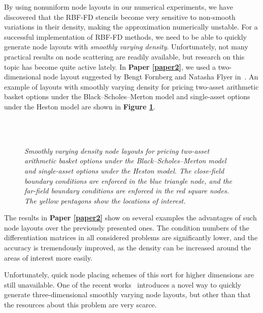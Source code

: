 \documentclass{UUThesisTemplate}
\begin{document}
\par
By using nonuniform node layouts in our numerical experiments, we have discovered that the RBF-FD stencils become very sensitive to non-smooth variations in their density, making the approximation numerically unstable. %
For a successful implementation of RBF-FD methods, we need to be able to quickly generate node layouts with \emph{smoothly varying density}. Unfortunately, not many practical results on node scattering are readily available, but research on this topic has become quite active lately. In \textbf{Paper \ref{paper2}}, we used a two-dimensional node layout suggested by Bengt Fornberg and Natasha Flyer in~\cite{fornberg2015fast}. An example of layouts with smoothly varying density for pricing two-asset arithmetic basket options under the Black--Scholes--Merton model and single-asset options under the Heston model are shown in \textbf{Figure \ref{fig:gridsmooth}}.
\begin{figure}[H]
\centering
\\
\vspace{11pt}
\\
\caption{\emph{Smoothly varying density node layouts for pricing two-asset arithmetic basket options under the Black--Scholes--Merton model and single-asset options under the Heston model. The close-field boundary conditions are enforced in the blue triangle node, and the far-field boundary conditions are enforced in the red square nodes. The yellow pentagons show the locations of interest.}}
\label{fig:gridsmooth}
\end{figure}

\par
The results in \textbf{Paper \ref{paper2}} show on several examples the advantages of such node layouts over the previously presented ones. The condition numbers of the differentiation matrices in all considered problems are significantly lower, and the accuracy is tremendously improved, as the density can be increased around the areas of interest more easily. 
\par
Unfortunately, quick node placing schemes of this sort for higher dimensions are still unavailable. One of the recent works~\cite{vlasiuk2017fast} introduces a novel way to quickly generate three-dimensional smoothly varying node layouts, but other than that the resources about this problem are very scarce.
%
\end{document}
